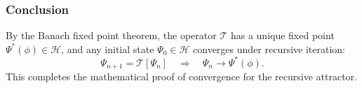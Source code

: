 \subsubsection*{Conclusion}

By the Banach fixed point theorem, the operator \( \mathcal{T} \) has a unique fixed point \( \Psi^*(\phi) \in \mathcal{H} \), and any initial state \( \Psi_0 \in \mathcal{H} \) converges under recursive iteration:
\[
\Psi_{n+1} = \mathcal{T}[\Psi_n] \quad \Rightarrow \quad \Psi_n \to \Psi^*(\phi).
\]
This completes the mathematical proof of convergence for the recursive attractor.
